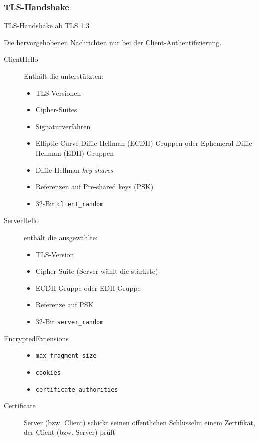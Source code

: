 \documentclass[a4paper,landscape]{article}
\begin{document}
\begin{multicols*}{4}
	\subsubsection{TLS-Handshake}
	\begin{center}
		
		\footnotesize TLS-Handshake ab TLS 1.3
	\end{center}
	Die hervorgehobenen Nachrichten nur bei der Client-Authentifizierung.
	\begin{description}
		\item[ClientHello] Enthält die unterstützten:
		      \begin{itemize}[leftmargin=0pt]
			      \item TLS-Versionen
			      \item Cipher-Suites
			      \item Signaturverfahren
			      \item Elliptic Curve Diffie-Hellman (ECDH) Gruppen oder
			            Ephemeral Diffie-Hellman (EDH) Gruppen
			      \item Diffie-Hellman \emph{key shares}
			      \item Referenzen auf Pre-shared keys (PSK)
			      \item 32-Bit \texttt{client\_random}
		      \end{itemize}
		\item[ServerHello] enthält die ausgewählte:
		      \begin{itemize}[leftmargin=0pt]
			      \item TLS-Version
			      \item Cipher-Suite (Server wählt die stärkste)
			      \item ECDH Gruppe oder EDH Gruppe
			      \item Referenze auf PSK
			      \item 32-Bit \texttt{server\_random}
		      \end{itemize}
		\item[EncryptedExtensions] \;
		      \begin{itemize}[leftmargin=0pt]
			      \item \texttt{max\_fragment\_size}
			      \item \texttt{cookies}
			      \item \texttt{certificate\_authorities}
		      \end{itemize}
		\item[Certificate] Server (bzw. Client) schickt seinen öffentlichen
		      Schlüsselin einem Zertifikat, der Client (bzw. Server) prüft

\end{description}
\end{multicols*}
\end{document}
